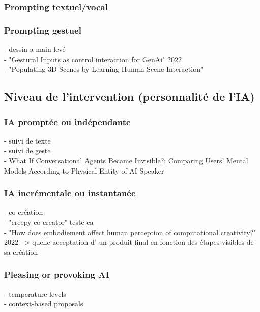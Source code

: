\subsubsection{Prompting textuel/vocal}
\subsubsection{Prompting gestuel}
- dessin a main levé \\
- "Gestural Inputs as control interaction for GenAi" 2022 \\
- "Populating 3D Scenes by Learning Human-Scene Interaction" \\
\subsection{Niveau de l'intervention (personnalité de l'IA)}
\subsubsection{IA promptée ou indépendante}
- suivi de texte \\
- suivi de geste \\
- What If Conversational Agents Became Invisible?: Comparing Users' Mental Models According to Physical Entity of AI Speaker \\
\subsubsection{IA incrémentale ou instantanée}
- co-création  \\
- "creepy co-creator" teste ca \\
- "How does embodiement affect human perception of computational creativity?" 2022 --> quelle acceptation d' un produit final en fonction des étapes visibles de sa création \\
\subsubsection{Pleasing or provoking AI}
- temperature levels \\
- context-based proposals 